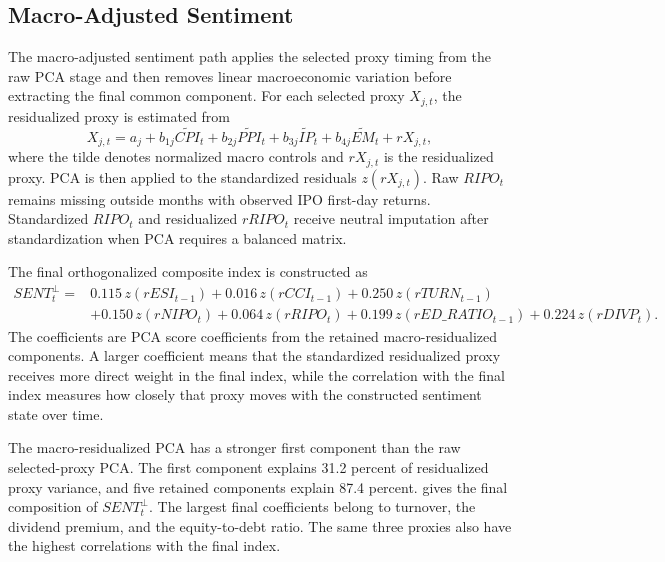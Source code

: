 \documentclass[11pt]{article}
\newcommand{\var}[1]{\ensuremath{#1}}
\begin{document}
\subsection{Macro-Adjusted Sentiment}
The macro-adjusted sentiment path applies the selected proxy timing from the raw PCA stage and then removes linear macroeconomic variation before extracting the final common component. For each selected proxy \(X_{j,t}\), the residualized proxy is estimated from
\begin{equation}
    X_{j,t}
    =
    a_j
    + b_{1j}\widetilde{CPI}_t
    + b_{2j}\widetilde{PPI}_t
    + b_{3j}\widetilde{IP}_t
    + b_{4j}\widetilde{EM}_t
    + rX_{j,t},
\end{equation}
where the tilde denotes normalized macro controls and \(rX_{j,t}\) is the residualized proxy. PCA is then applied to the standardized residuals \(z(rX_{j,t})\). Raw \var{RIPO_t} remains missing outside months with observed IPO first-day returns. Standardized \var{RIPO_t} and residualized \var{rRIPO_t} receive neutral imputation after standardization when PCA requires a balanced matrix.

The final orthogonalized composite index is constructed as
\begin{equation}
\begin{aligned}
    SENT^{\perp}_{t}
    ={}&
    0.115\,z(rESI_{t-1})
    + 0.016\,z(rCCI_{t-1})
    + 0.250\,z(rTURN_{t-1}) \\
    &+ 0.150\,z(rNIPO_t)
    + 0.064\,z(rRIPO_t)
    + 0.199\,z(rED\_RATIO_{t-1})
    + 0.224\,z(rDIVP_t).
\end{aligned}
\label{eq:sent_orth_composite}
\end{equation}
The coefficients are PCA score coefficients from the retained macro-residualized components. A larger coefficient means that the standardized residualized proxy receives more direct weight in the final index, while the correlation with the final index measures how closely that proxy moves with the constructed sentiment state over time.

The macro-residualized PCA has a stronger first component than the raw selected-proxy PCA. The first component explains 31.2 percent of residualized proxy variance, and five retained components explain 87.4 percent.  gives the final composition of \var{SENT^{\perp}_t}. The largest final coefficients belong to turnover, the dividend premium, and the equity-to-debt ratio. The same three proxies also have the highest correlations with the final index.
\end{document}
